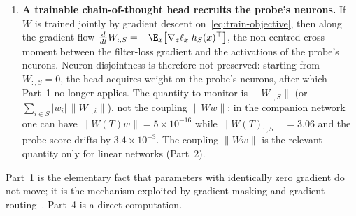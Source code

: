 \begin{theorem}
\begin{enumerate}
  \item \textbf{A trainable chain-of-thought head recruits the probe's neurons.} If $W$ is trained jointly by gradient descent on~\eqref{eq:train-objective}, then along the gradient flow $\tfrac{d}{dt} W_{:,S} = -\E_x\big[\nabla_z \ell_x\; h_S(x)^\top\big]$, the non-centred cross moment between the filter-loss gradient and the activations of the probe's neurons. Neuron-disjointness is therefore not preserved: starting from $W_{:,S} = 0$, the head acquires weight on the probe's neurons, after which Part~1 no longer applies. The quantity to monitor is $\|W_{:,S}\|$ (or $\sum_{i \in S} |w_i|\, \|W_{:,i}\|$), not the coupling $\|Ww\|$: in the companion network one can have $\|W(T) w\| = 5 \times 10^{-16}$ while $\|W(T)_{:,S}\| = 3.06$ and the probe score drifts by $3.4 \times 10^{-3}$. The coupling $\|Ww\|$ is the relevant quantity only for linear networks (Part~2).
\end{enumerate}
\end{theorem}

Part~1 is the elementary fact that parameters with identically zero gradient do not move; it is the mechanism exploited by gradient masking and gradient routing~\cite{cloud2024}. Part~4 is a direct computation.


